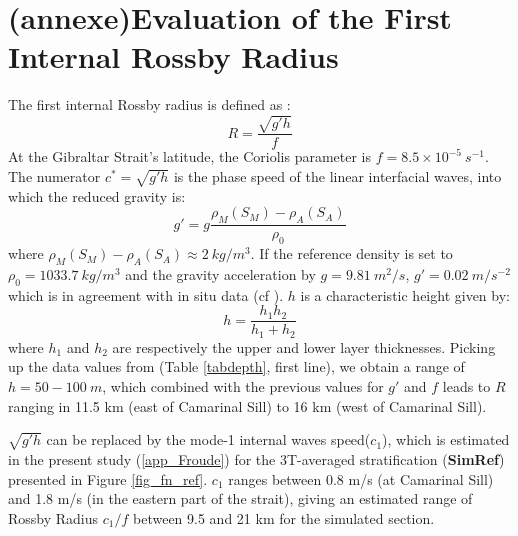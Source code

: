 \section{(annexe)Evaluation of the First Internal Rossby Radius}
\label{app_Rossby}

The first internal Rossby radius is defined as :
\begin{equation}
\label{eqRosby}
R = \frac{\sqrt{g'h}}{f}
\end{equation} 
 At the Gibraltar Strait's latitude, the Coriolis parameter is $f=8.5 \times 10^{-5}\ s^{-1}$.
The numerator $c^{*}={\sqrt{g'h}}$ is the phase speed of the linear interfacial waves, into which the reduced gravity is:
\begin{equation}
g'= g \frac{\rho_M(S_M) - \rho_A(S_A)}{\rho_0}
\end{equation}
where $\rho_M(S_M) - \rho_A(S_A) \approx 2\ kg/m^{3}$. If the reference density is set to $\rho_0=1033.7\ kg/m^{3}$ and the gravity acceleration by $g=9.81\ m^2/s$, $g'=0.02\ m/s^{-2}$ which is in agreement with in situ data (cf \citet{Bryden94}). $h$ is a characteristic height given by:
\begin{equation}
h=\frac{h_1 h_2}{h_1+h_2}
\end{equation}
where $h_1$ and $h_2$ are respectively the upper and lower layer thicknesses. Picking up the data values from \citet{FA1988} (Table \ref{tabdepth}, first line), we obtain a range of $h = 50 - 100\ m$, which combined with the previous values for $g'$ and $f$ leads to $R$ ranging in 11.5 km (east of Camarinal Sill) to 16 km (west of Camarinal Sill). 

$\sqrt{g'h}$ can be replaced by the mode-1 internal waves speed($c_1$), which is estimated in the present study (\ref{app_Froude}) for the 3T-averaged stratification (\textbf{SimRef}) presented in Figure \ref{fig_fn_ref}. $c_1$ ranges between 0.8 m/s (at Camarinal Sill) and 1.8 m/s (in the eastern part of the strait), giving an estimated range of Rossby Radius ${c_1}/{f}$ between 9.5 and 21 km for the simulated section.


